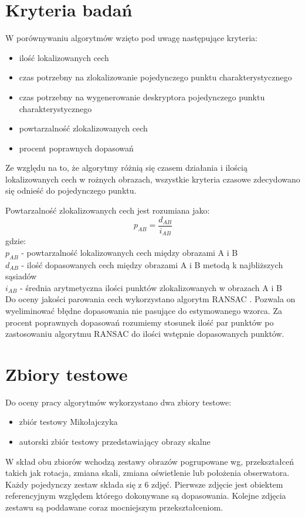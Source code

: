 \FloatBarrier
\section{Kryteria badań}
W porównywaniu algorytmów wzięto pod uwagę następujące kryteria:
\begin{itemize}
\item ilość lokalizowanych cech
\item czas potrzebny na zlokalizowanie pojedynczego punktu charakterystycznego
\item czas potrzebny na wygenerowanie deskryptora pojedynczego punktu charakterystycznego
\item powtarzalność zlokalizowanych cech
\item procent poprawnych dopasowań
\end{itemize}



Ze względu na to, że algorytmy różnią się czasem działania i ilością lokalizowanych cech w rożnych obrazach, wszystkie kryteria czasowe zdecydowano się odnieść do pojedynczego punktu.


Powtarzalność zlokalizowanych cech jest rozumiana jako:
\begin{equation}
p_{AB}  = \frac{d_{AB}}{i_{AB}}
\end{equation}
gdzie:\\
$p_{AB}$ - powtarzalność lokalizowanych cech między obrazami A i B\\
$d_{AB}$ - ilość dopasowanych cech między obrazami A i B metodą k najbliższych sąsiadów\\
$i_{AB}$ - średnia arytmetyczna ilości punktów zlokalizowanych w obrazach A i B\\


Do oceny jakości parowania cech wykorzystano algorytm RANSAC \cite{ransac}. Pozwala on wyeliminować błędne dopasowania nie pasujące do estymowanego wzorca. Za procent poprawnych dopasowań rozumiemy stosunek ilość par punktów po zastosowaniu algorytmu RANSAC do ilości wstępnie dopasowanych punktów.
\FloatBarrier
\section{Zbiory testowe}
Do oceny pracy algorytmów wykorzystano dwa zbiory testowe:
\begin{itemize}
\item zbiór testowy Mikołajczyka
\item autorski zbiór testowy przedstawiający obrazy skalne
\end{itemize}
W skład obu zbiorów wchodzą zestawy obrazów pogrupowane wg, przekształceń takich jak rotacja, zmiana skali, zmiana oświetlenie lub położenia obserwatora. Każdy pojedynczy zestaw składa się z 6 zdjęć. Pierwsze zdjęcie jest obiektem referencyjnym względem którego dokonywane są dopasowania. Kolejne zdjęcia zestawu są poddawane coraz mocniejszym przekształceniom.

\FloatBarrier